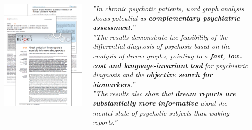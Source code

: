 \begin{minipage}[t]{\textwidth}
    \begin{columns}
        \begin{column}{0.5\textwidth}
            \includegraphics[width=\textwidth]{immagini/articles}
        \end{column}
        \begin{column}{0.5\textwidth}
            \begin{spacing}{0.6}
        {\footnotesize{\textit{''In chronic psychotic patients, word graph analysis shows potential as
            \textbf{\color{orangeUnicam}complementary psychiatric assessment}.''}}}\\
        \vspace{0.7cm}
        {\footnotesize{\textit{''The results demonstrate the feasibility of the differential
        diagnosis of psychosis based on the analysis of dream graphs, pointing to a \textbf{\color{orangeUnicam}fast, low-cost and
        language-invariant tool} for psychiatric diagnosis and the \textbf{\color{orangeUnicam}objective search for biomarkers}.''}}}\\
            \vspace{0.7cm}
        {\footnotesize{\textit{''The results also show that \textbf{\color{orangeUnicam}dream reports are substantially more
        informative} about the mental state of psychotic subjects than waking reports.''}}}\\
        \end{spacing}
        \end{column}
    \end{columns}
\end{minipage}